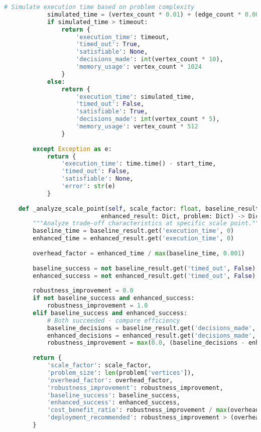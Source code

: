 \begin{lstlisting}[language=Python, caption=Scalability Analysis and Deployment Boundary Assessment]
            # Simulate execution time based on problem complexity
            simulated_time = (vertex_count * 0.01) + (edge_count * 0.005)
            if simulated_time > timeout:
                return {
                    'execution_time': timeout,
                    'timed_out': True,
                    'satisfiable': None,
                    'decisions_made': int(vertex_count * 10),
                    'memory_usage': vertex_count * 1024
                }
            else:
                return {
                    'execution_time': simulated_time,
                    'timed_out': False,
                    'satisfiable': True,
                    'decisions_made': int(vertex_count * 5),
                    'memory_usage': vertex_count * 512
                }
                
        except Exception as e:
            return {
                'execution_time': time.time() - start_time,
                'timed_out': False,
                'satisfiable': None,
                'error': str(e)
            }
    
    def _analyze_scale_point(self, scale_factor: float, baseline_result: Dict, 
                           enhanced_result: Dict, problem: Dict) -> Dict:
        """Analyze trade-off characteristics at specific scale point."""
        baseline_time = baseline_result.get('execution_time', 0)
        enhanced_time = enhanced_result.get('execution_time', 0)
        
        overhead_factor = enhanced_time / max(baseline_time, 0.001)
        
        baseline_success = not baseline_result.get('timed_out', False)
        enhanced_success = not enhanced_result.get('timed_out', False)
        
        robustness_improvement = 0.0
        if not baseline_success and enhanced_success:
            robustness_improvement = 1.0
        elif baseline_success and enhanced_success:
            # Both succeeded - compare efficiency
            baseline_decisions = baseline_result.get('decisions_made', 1)
            enhanced_decisions = enhanced_result.get('decisions_made', 1)
            robustness_improvement = max(0.0, (baseline_decisions - enhanced_decisions) / baseline_decisions)
        
        return {
            'scale_factor': scale_factor,
            'problem_size': len(problem['vertices']),
            'overhead_factor': overhead_factor,
            'robustness_improvement': robustness_improvement,
            'baseline_success': baseline_success,
            'enhanced_success': enhanced_success,
            'cost_benefit_ratio': robustness_improvement / max(overhead_factor - 1.0, 0.001),
            'deployment_recommended': robustness_improvement > (overhead_factor - 1.0) * 0.5
        }
    

\end{lstlisting}
